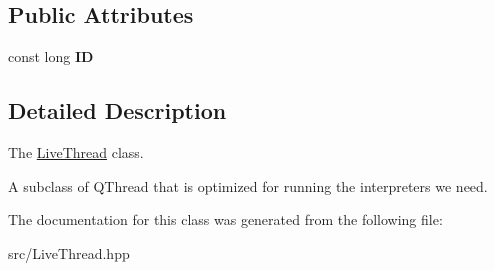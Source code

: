 \subsection*{Public Attributes}
\begin{DoxyCompactItemize}
\item 
\hypertarget{classLiveThread_a5cfdefd7574fb1f34bbe1d21b5e3c1d8}{const long {\bfseries I\+D}}\label{classLiveThread_a5cfdefd7574fb1f34bbe1d21b5e3c1d8}

\end{DoxyCompactItemize}


\subsection{Detailed Description}
The \hyperlink{classLiveThread}{Live\+Thread} class. 

A subclass of Q\+Thread that is optimized for running the interpreters we need. 

The documentation for this class was generated from the following file\+:\begin{DoxyCompactItemize}
\item 
src/Live\+Thread.\+hpp\end{DoxyCompactItemize}

